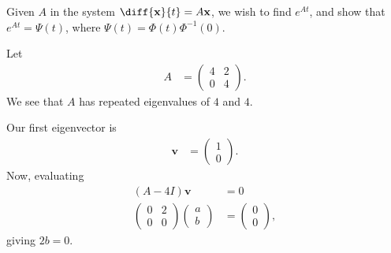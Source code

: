 \documentclass[10pt]{mypackage}
\begin{document}
  Given $A$ in the system $\diff{\mathbf{x}}{t} = A\mathbf{x}$, we wish to find $e^{At}$, and show that $e^{At} = \Psi(t)$, where $\Psi(t) = \Phi(t)\Phi^{-1}(0)$.
\begin{example}
  Let
  \begin{align*}
    A &= \begin{pmatrix}4 & 2 \\ 0 & 4\end{pmatrix}.
  \end{align*}
  We see that $A$ has repeated eigenvalues of $4$ and $4$.\newline

  Our first eigenvector is
  \begin{align*}
    \mathbf{v} &= \begin{pmatrix}1\\0\end{pmatrix}.
  \end{align*}
  Now, evaluating
  \begin{align*}
    \left( A - 4I \right)\mathbf{v} &= 0\\
    \begin{pmatrix}0 & 2\\0 & 0\end{pmatrix} \begin{pmatrix}a\\b\end{pmatrix} &= \begin{pmatrix}0\\0\end{pmatrix},
  \end{align*}
  giving $2b = 0$.\newline


\end{example}
\end{document}
